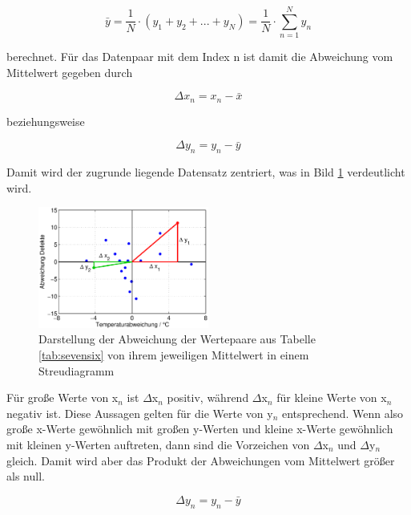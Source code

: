 \begin{equation}\label{eq:sevenseventeen}
\bar{y}=\dfrac{1}{N} \cdot \left(y_{1} +y_{2} +...+y_{N} \right)=\dfrac{1}{N} \cdot \sum _{n=1}^{N}y_{n}
\end{equation}

\noindent berechnet. F\"{u}r das Datenpaar mit dem Index n ist damit die Abweichung vom Mittelwert gegeben durch 

\begin{equation}\label{eq:seveneighteen}
\Delta x_{n} =x_{n} -\bar{x}
\end{equation}

\noindent beziehungsweise

\begin{equation}\label{eq:sevennineteen}
\Delta y_{n} =y_{n} -\bar{y}
\end{equation}

\clearpage

\noindent Damit wird der zugrunde liegende Datensatz zentriert, was in Bild \ref{fig:DefekteTemperatur3} verdeutlicht wird.

\noindent 
\begin{figure}[H]
  \centerline{\includegraphics[width=0.5\textwidth]{Kapitel7/Bilder/image8}}
  \caption{Darstellung der Abweichung der Wertepaare aus Tabelle \ref{tab:sevensix} von ihrem jeweiligen Mittelwert in einem Streudiagramm}
  \label{fig:DefekteTemperatur3}
\end{figure}

\noindent F\"{u}r gro{\ss}e Werte von x$_{n}$ ist $\Delta$x$_{n}$ positiv, w\"{a}hrend $\Delta$x$_{n}$ f\"{u}r kleine Werte von x$_{n}$ negativ ist. Diese Aussagen gelten f\"{u}r die Werte von y$_{n}$ entsprechend. Wenn also gro{\ss}e x-Werte gew\"{o}hnlich mit gro{\ss}en y-Werten und kleine x-Werte gew\"{o}hnlich mit kleinen y-Werten auftreten, dann sind die Vorzeichen von $\Delta$x$_{n}$ und $\Delta$y$_{n}$ gleich. Damit wird aber das Produkt der Abweichungen vom Mittelwert gr\"{o}{\ss}er als null.

\begin{equation}\label{eq:seventwenty}
\Delta y_{n} =y_{n} -\bar{y}
\end{equation}

